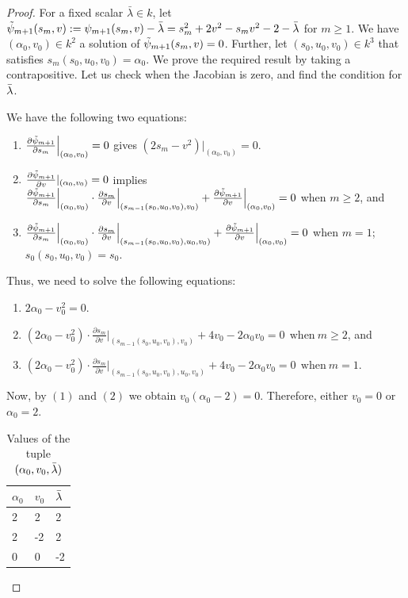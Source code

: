 \documentclass[10pt,twoside]{amsart}
\theoremstyle{definition}
\theoremstyle{definition}
\begin{document}
\begin{proof}
For a fixed scalar $\bar\lambda \in k$, let  $\Tilde{\psi}_{m+1}(s_m, v) := \psi_{m+1}(s_m, v)- \bar \lambda = s_m^2 + 2v^2 - s_mv^2 - 2 - \Bar{\lambda}$ for $m\geq 1$. We have $(\alpha_0, v_0)\in k^2$ a solution of $\Tilde{\psi}_{m+1}(s_m, v) =0$. Further, let $(s_0, u_0, v_0)\in k^3$ that satisfies $s_m(s_0, u_0, v_0) = \alpha_0$. We prove the required result by taking a contrapositive. Let us check when the Jacobian is zero, and find the condition for $\Bar{\lambda}$. 

We have the following two equations:
\begin{enumerate}
\item $\frac{\partial\Tilde{\psi}_{m+1}}{\partial s_m}\Big |_{(\alpha_0,v_0)} = 0$ gives $(2s_m-v^2)\Big |_{(\alpha_0, v_0)} = 0$.
\item $\frac{\partial\Tilde{\psi}_{m+1}}{\partial v}|_{(\alpha_0, v_0)} = 0$ implies $\frac{\partial\Tilde{\psi}_{m+1}}{\partial s_m}\Big |_{(\alpha_0,v_0)} \cdot \frac{\partial s_m}{\partial v}\Big |_{(s_{m-1}(s_0, u_0, v_0), v_0)} + \frac{\partial\Tilde{\psi}_{m+1}}{\partial v}\Big |_{(\alpha_0, v_0)} = 0$ when $m\geq 2$, and 
\item[] $\frac{\partial\Tilde{\psi}_{m+1}}{\partial s_m}\Big |_{(\alpha_0,v_0)}\cdot \frac{\partial s_m}{\partial v}\Big |_{(s_{m-1}(s_0, u_0, v_0), u_0, v_0)} + \frac{\partial\Tilde{\psi}_{m+1}}{\partial v}\Big |_{(\alpha_0,v_0)} = 0$ when  $m=1$; $s_0(s_0,u_0,v_0)=s_0$.
\end{enumerate}
Thus, we need to solve the following equations:
\begin{enumerate}
\item $2\alpha_0-v_0^2=0$.
\item $(2\alpha_0-v_0^2)\cdot \frac{\partial s_m}{\partial v}\Big |_{(s_{m-1}(s_0,u_0,v_0),v_0)}+4v_0-2\alpha_0v_0=0\ \ \text{when}\ m\geq 2$, and 
\item[] $(2\alpha_0-v_0^2)\cdot \frac{\partial s_m}{\partial v}\Big |_{(s_{m-1}(s_0,u_0,v_0),u_0,v_0)}+4v_0-2\alpha_0v_0=0\ \ \text{when}\ m=1.$
\end{enumerate}
 
Now, by $(1)$ and $(2)$ we obtain $v_0(\alpha_0 - 2) = 0$. Therefore, either $v_0 = 0$ or $\alpha_0 = 2$. 
\begin{table}[ht]\caption{Values of the tuple $(\alpha_0,v_0,\Bar{\lambda})$}
\label{tab:product s_0u_0v_0}
\scriptsize
\centering
\renewcommand{\arraystretch}{1.8}\begin{tabular}{|l|l|l|}
\hline
$\alpha_0$ & $v_0$ & $\Bar{\lambda}$ \\ \hline
2    & 2  & 2 \\ \hline
2   & -2   & 2 \\ \hline
0   & 0   & -2 \\ \hline
\end{tabular}
\end{table}


\end{proof}
\end{document}
